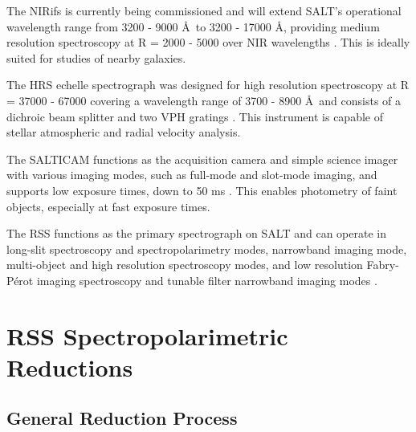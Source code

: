The \gls{NIRifs} is currently being commissioned and will extend SALT's operational wavelength range from 3200 - 9000 \AA\ to 3200 - 17000 \AA, providing medium resolution spectroscopy at R = 2000 - 5000 over NIR wavelengths \citep{NIR, SALT_NIR}. This is ideally suited for studies of nearby galaxies.

The \gls{HRS} echelle spectrograph was designed for high resolution spectroscopy at R = 37000 - 67000 covering a wavelength range of 3700 - 8900 \AA\ and consists of a dichroic beam splitter and two \gls{VPH} gratings \citep{SALT_hires}. This instrument is capable of stellar atmospheric and radial velocity analysis.

The SALTICAM functions as the acquisition camera and simple science imager with various imaging modes, such as full-mode and slot-mode imaging, and supports low exposure times, down to 50 ms \citep{SALTICAM}. This enables photometry of faint objects, especially at fast exposure times.
\prgph

The \gls{RSS} functions as the primary spectrograph on \gls{SALT} and can operate in long-slit spectroscopy and spectropolarimetry modes, narrowband imaging mode, multi-object and high resolution spectroscopy modes, and low resolution Fabry-P\'erot imaging spectroscopy and tunable filter narrowband imaging modes \citep[for an in-depth discussion on operational modes see][]{SALT_operational_modes}.
\prgph


\section{RSS Spectropolarimetric Reductions} %


\subsection{General Reduction Process} %


